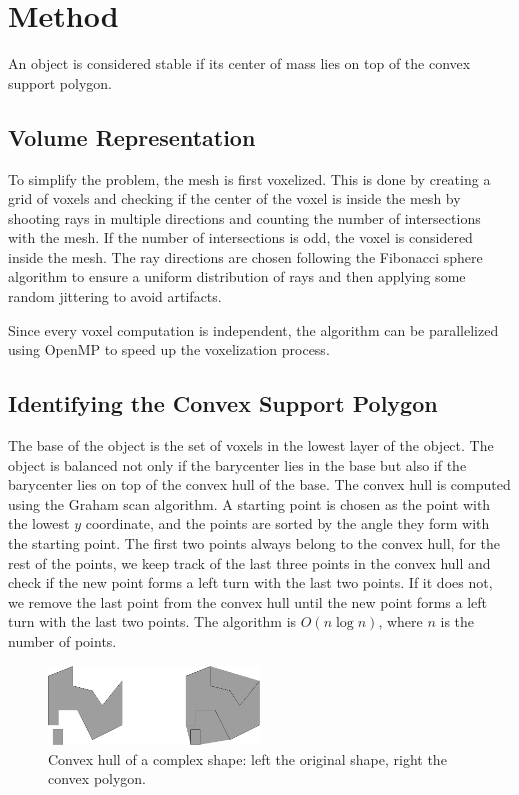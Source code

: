 \documentclass[tikz,10pt,fleqn]{article}
\begin{document}
\section{Method}
An object is considered stable if its center of mass lies on top of the convex support polygon.

\subsection{Volume Representation}
To simplify the problem, the mesh is first voxelized. This is done by creating a grid of voxels and checking if the center of the voxel is inside the mesh by shooting rays in multiple directions and counting the number of intersections with the mesh. If the number of intersections is odd, the voxel is considered inside the mesh. The ray directions are chosen following the Fibonacci sphere algorithm to ensure a uniform distribution of rays and then applying some random jittering to avoid artifacts.

Since every voxel computation is independent, the algorithm can be parallelized using OpenMP to speed up the voxelization process.

\subsection{Identifying the Convex Support Polygon}
The base of the object is the set of voxels in the lowest layer of the object.
The object is balanced not only if the barycenter lies in the base but also if the barycenter lies on top of the convex hull of the base. The convex hull is computed using the Graham scan algorithm. A starting point is chosen as the point with the lowest $y$ coordinate, and the points are sorted by the angle they form with the starting point. The first two points always belong to the convex hull, for the rest of the points, we keep track of the last three points in the convex hull and check if the new point forms a left turn with the last two points. If it does not, we remove the last point from the convex hull until the new point forms a left turn with the last two points. The algorithm is $O(n \log n)$, where $n$ is the number of points.

\begin{figure}[h]
    \centering
    \includegraphics[width=0.5\textwidth]{fig/convex_hull.pdf}
    \caption{Convex hull of a complex shape: left the original shape, right the convex polygon.}
    \label{fig:convex_hull}
\end{figure}
\end{document}

